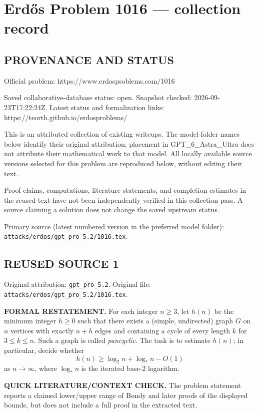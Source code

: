 \section*{Erd\H{o}s Problem 1016 --- collection record}

\subsection*{PROVENANCE AND STATUS}
Official problem: https://www.erdosproblems.com/1016

Saved collaborative-database status: open.
Snapshot checked: 2026-09-23T17:22:24Z.
Latest status and formalization links: https://teorth.github.io/erdosproblems/

This is an attributed collection of existing writeups. The model-folder names below identify their original attribution; placement in GPT\_6\_Astra\_Ultra does not attribute their mathematical work to that model. All locally available source versions selected for this problem are reproduced below, without editing their text.

Proof claims, computations, literature statements, and completion estimates in the reused text have not been independently verified in this collection pass. A source claiming a solution does not change the saved upstream status.

Primary source (latest numbered version in the preferred model folder): \texttt{attacks/erdos/gpt\_pro\_5.2/1016.tex}.

\subsection*{REUSED SOURCE 1}
Original attribution: \texttt{gpt\_pro\_5.2}.
Original file: \texttt{attacks/erdos/gpt\_pro\_5.2/1016.tex}.


\noindent\textbf{FORMAL RESTATEMENT.}
For each integer $n\ge 3$, let $h(n)$ be the minimum integer $h\ge 0$ such that there exists a (simple, undirected) graph $G$ on $n$ vertices with exactly $n+h$ edges and containing a cycle of every length $k$ for $3\le k\le n$. Such a graph is called \emph{pancyclic}. The task is to estimate $h(n)$; in particular, decide whether
\[
h(n)\ge \log_2 n + \log_* n - O(1)
\]
as $n\to\infty$, where $\log_* n$ is the iterated base-2 logarithm.

\medskip
\noindent\textbf{QUICK LITERATURE/CONTEXT CHECK.}
The problem statement reports a claimed lower/upper range of Bondy and later proofs of the displayed bounds, but does not include a full proof in the extracted text.

